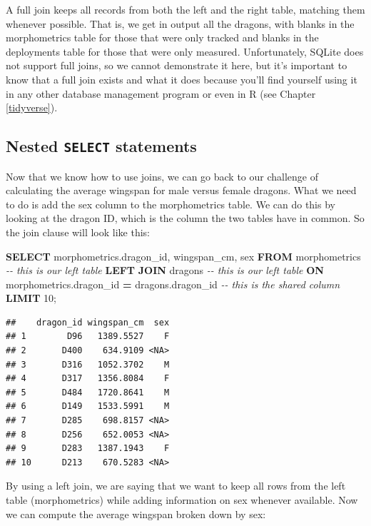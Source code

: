 \documentclass[
]{book}
\newenvironment{Shaded}{\begin{snugshade}}{\end{snugshade}}
\newcommand{\CommentTok}[1]{\textcolor[rgb]{0.56,0.35,0.01}{\textit{#1}}}
\newcommand{\DecValTok}[1]{\textcolor[rgb]{0.00,0.00,0.81}{#1}}
\newcommand{\KeywordTok}[1]{\textcolor[rgb]{0.13,0.29,0.53}{\textbf{#1}}}
\newcommand{\NormalTok}[1]{#1}
\newcommand{\OperatorTok}[1]{\textcolor[rgb]{0.81,0.36,0.00}{\textbf{#1}}}
\begin{document}
A full join keeps all records from both the left and the right table, matching
them whenever possible. That is, we get in output all the dragons, with blanks
in the morphometrics table for those that were only tracked and blanks in the
deployments table for those that were only measured. Unfortunately, SQLite does
not support full joins, so we cannot demonstrate it here, but it's important to
know that a full join exists and what it does because you'll find yourself using
it in any other database management program or even in R (see Chapter \ref{tidyverse}).

\hypertarget{nested-select-statements}{%
\subsection{\texorpdfstring{Nested \texttt{SELECT} statements}{Nested SELECT statements}}\label{nested-select-statements}}

Now that we know how to use joins, we can go back to our challenge of calculating
the average wingspan for male versus female dragons. What we need to do is add
the sex column to the morphometrics table. We can do this by looking at the
dragon ID, which is the column the two tables have in common. So the join clause
will look like this:

\begin{Shaded}
\begin{Highlighting}[]
\KeywordTok{SELECT}\NormalTok{ morphometrics.dragon\_id, wingspan\_cm, sex}
\KeywordTok{FROM}\NormalTok{ morphometrics }\CommentTok{{-}{-} this is our left table}
\KeywordTok{LEFT} \KeywordTok{JOIN}\NormalTok{ dragons }\CommentTok{{-}{-} this is our left table }
\KeywordTok{ON}\NormalTok{ morphometrics.dragon\_id }\OperatorTok{=}\NormalTok{ dragons.dragon\_id }\CommentTok{{-}{-} this is the shared column}
\KeywordTok{LIMIT} \DecValTok{10}\NormalTok{;}
\end{Highlighting}
\end{Shaded}

\begin{verbatim}
##    dragon_id wingspan_cm  sex
## 1        D96   1389.5527    F
## 2       D400    634.9109 <NA>
## 3       D316   1052.3702    M
## 4       D317   1356.8084    F
## 5       D484   1720.8641    M
## 6       D149   1533.5991    M
## 7       D285    698.8157 <NA>
## 8       D256    652.0053 <NA>
## 9       D283   1387.1943    F
## 10      D213    670.5283 <NA>
\end{verbatim}

By using a left join, we are saying that we want to keep all rows from the left
table (morphometrics) while adding information on sex whenever available. Now we
can compute the average wingspan broken down by sex:
\end{document}
